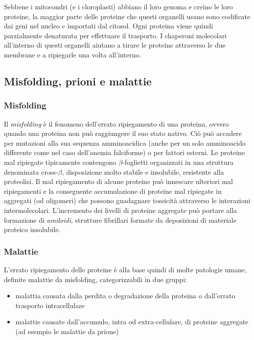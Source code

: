 Sebbene i mitocondri (e i cloroplasti) abbiano il loro genoma e creino le loro proteine, la maggior parte delle proteine che questi organelli usano sono codificate dai geni nel nucleo e importati dal citosol. Ogni proteina viene quindi parzialmente denaturata per effettuare il trasporto. I chaperoni molecolari all'interno di questi organelli aiutano a tirare le proteine attraverso le due membrane e a ripiegarle una volta all'interno\supercite{alberts2018essential}.


\subsection{Misfolding, prioni e malattie}
{
	
\subsubsection{Misfolding}
Il \textit{misfolding} è il fenomeno dell'errato ripiegamento di una proteina, ovvero quando una proteina non può raggiungere il suo stato nativo. Ciò può accadere per mutazioni alla sua sequenza amminoacidica (anche per un solo amminoacido differente come nel caso dell'anemia falciforme) o per fattori esterni. Le proteine mal ripiegate tipicamente contengono $\beta$-foglietti organizzati in una struttura denominata cross-$\beta$, disposizione molto stabile e insolubile, resistente alla proteolisi. Il mal ripiegamento di alcune proteine può innescare ulteriori mal ripiegamenti e la conseguente accumulazione di proteine mal ripiegate in aggregati (od oligomeri) che possono guadagnare tossicità attraverso le interazioni intermolecolari. L'incremento dei livelli di proteine aggregate può portare alla formazione di \textit{amiloidi}, strutture fibrillari formate da deposizioni di materiale proteico insolubile. 

\subsubsection{Malattie}
L'errato ripiegamento delle proteine è alla base quindi di molte patologie umane, definite malattie da misfolding, categorizzabili in due gruppi:

\begin{itemize}
	\item malattia causata dalla perdita o degradazione della proteina o dall'errato trasporto intracellulare
	\item malattie causate dall'accumulo, intra od extra-cellulare, di proteine aggregate (ad esempio le malattie da prione)
\end{itemize}

}
